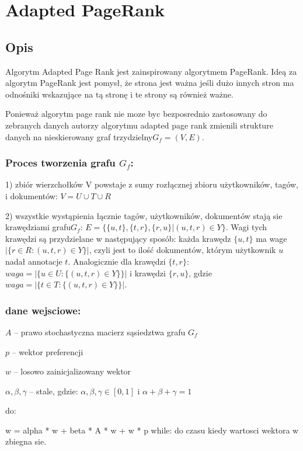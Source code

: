 \chapter{Adapted PageRank}
\section{Opis}

Algorytm Adapted Page Rank jest zainspirowany algorytmem PageRank. Ideą za algorytm PageRank jest pomysł, że strona jest ważna jeśli dużo innych stron ma odnośniki wskazujące na tą stronę i te strony są również ważne.

Ponieważ algorytm page rank nie moze byc bezposrednio zastosowany do zebranych danych autorzy algorytmu adapted page rank zmienili strukture danych na nieskierowany graf trzydzielny$ G_f = (V,E)$.

\subsection*{Proces tworzenia grafu $G_f$:}

1) zbiór wierzchołków V powstaje z sumy rozłącznej zbioru użytkowników, tagów, i dokumentów: $V = U \cup T \cup R$

2) wszystkie wystąpienia łącznie tagów, użytkowników, dokumentów  stają sie krawędziami grafu$ G_f$: $E = \{\{u,t\}, \{t,r\} ,\{r,u\} | (u,t,r) \in Y \}$. Wagi tych krawędzi są przydzielane w następujący sposób: każda krawędz $\{u,t\}$ ma wage $| \{r \in R : (u,t,r) \in Y\}|$, czyli jest to ilość dokumentów, którym użytkownik $u$ nadał annotacje $t$. Analogicznie dla krawędzi $\{t,r\}$: $waga=|\{u \in U : \{(u,t,r) \in Y\}\}|$ i krawędzi $\{r, u\}$, gdzie 
$waga=| \{t \in T : \{(u,t,r) \in Y \} \} |$.

\subsection*{dane wejsciowe:}
$A$ -- prawo stochastyczna macierz sąsiedztwa grafu $G_f$

$p$ -- wektor preferencji

$w$ -- losowo zainicjalizowany wektor

$\alpha, \beta, \gamma$ -- stale, gdzie: $\alpha, \beta, \gamma \in [0,1]$ i $\alpha + \beta + \gamma = 1$

do:

w = alpha * w + beta * A * w + w * p
while:
    do czasu kiedy wartosci wektora w zbiegna sie.

